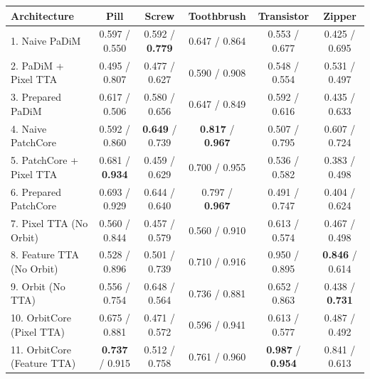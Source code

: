 \documentclass{article}
\begin{document}
\begin{table}[t]
		\begin{tabular}{@{} l ccccc @{}}
			\toprule
			\textbf{Architecture} & \textbf{Pill} & \textbf{Screw} & \textbf{Toothbrush} & \textbf{Transistor} & \textbf{Zipper} \\
			\midrule
			1. Naive PaDiM & 0.597 / 0.550 & 0.592 / \textbf{0.779} & 0.647 / 0.864 & 0.553 / 0.677 & 0.425 / 0.695 \\
			2. PaDiM + Pixel TTA & 0.495 / 0.807 & 0.477 / 0.627 & 0.590 / 0.908 & 0.548 / 0.554 & 0.531 / 0.497 \\
			3. Prepared PaDiM & 0.617 / 0.506 & 0.580 / 0.656 & 0.647 / 0.849 & 0.592 / 0.616 & 0.435 / 0.633 \\
			4. Naive PatchCore & 0.592 / 0.860 & \textbf{0.649} / 0.739 & \textbf{0.817} / \textbf{0.967} & 0.507 / 0.795 & 0.607 / 0.724 \\
			5. PatchCore + Pixel TTA & 0.681 / \textbf{0.934} & 0.459 / 0.629 & 0.700 / 0.955 & 0.536 / 0.582 & 0.383 / 0.498 \\
			6. Prepared PatchCore & 0.693 / 0.929 & 0.644 / 0.640 & 0.797 / \textbf{0.967} & 0.491 / 0.747 & 0.404 / 0.624 \\
			7. Pixel TTA (No Orbit) & 0.560 / 0.844 & 0.457 / 0.579 & 0.560 / 0.910 & 0.613 / 0.574 & 0.467 / 0.498 \\
			8. Feature TTA (No Orbit) & 0.528 / 0.896 & 0.501 / 0.739 & 0.710 / 0.916 & 0.950 / 0.895 & \textbf{0.846} / 0.614 \\
			9. Orbit (No TTA) & 0.556 / 0.754 & 0.648 / 0.564 & 0.736 / 0.881 & 0.652 / 0.863 & 0.438 / \textbf{0.731} \\
			10. OrbitCore (Pixel TTA) & 0.675 / 0.881 & 0.471 / 0.572 & 0.596 / 0.941 & 0.613 / 0.577 & 0.487 / 0.492 \\
			11. OrbitCore (Feature TTA)& \textbf{0.737} / 0.915 & 0.512 / 0.758 & 0.761 / 0.960 & \textbf{0.987} / \textbf{0.954} & 0.841 / 0.613 \\
			\bottomrule
		\end{tabular}
		
		\vspace{1.5em}
		

\end{table}
\end{document}
